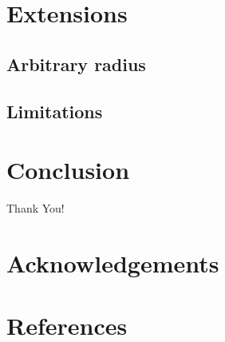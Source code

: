 \documentclass[twofold]{article}
\theoremstyle{plain}
\theoremstyle{definition}
\begin{document}
\section{Extensions}


\subsection{Arbitrary radius}

\subsection{Limitations}

\section{Conclusion}
Thank You!

\section{Acknowledgements}

\section{References}
\end{document}
